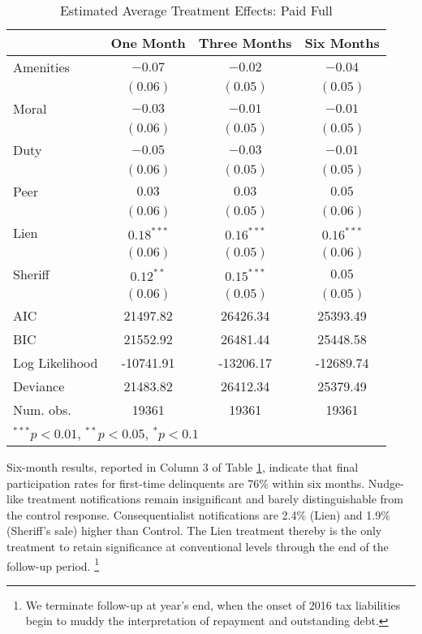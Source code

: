 \documentclass[12pt,titlepage]{article}
\begin{document}
\begin{table}[htbp]
\caption{Estimated Average Treatment Effects: Paid Full}
\begin{center}
\begin{tabular}{l c c c }
\hline
               & One Month & Three Months & Six Months \\
\hline
Amenities      & $-0.07$      & $-0.02$      & $-0.04$      \\
               & $(0.06)$     & $(0.05)$     & $(0.05)$     \\
Moral          & $-0.03$      & $-0.01$      & $-0.01$      \\
               & $(0.06)$     & $(0.05)$     & $(0.05)$     \\
Duty           & $-0.05$      & $-0.03$      & $-0.01$      \\
               & $(0.06)$     & $(0.05)$     & $(0.05)$     \\
Peer           & $0.03$       & $0.03$       & $0.05$       \\
               & $(0.06)$     & $(0.05)$     & $(0.06)$     \\
Lien           & $0.18^{***}$ & $0.16^{***}$ & $0.16^{***}$ \\
               & $(0.06)$     & $(0.05)$     & $(0.06)$     \\
Sheriff        & $0.12^{**}$  & $0.15^{***}$ & $0.05$       \\
               & $(0.06)$     & $(0.05)$     & $(0.05)$     \\
\hline
AIC            & 21497.82     & 26426.34     & 25393.49     \\
BIC            & 21552.92     & 26481.44     & 25448.58     \\
Log Likelihood & -10741.91    & -13206.17    & -12689.74    \\
Deviance       & 21483.82     & 26412.34     & 25379.49     \\
Num. obs.      & 19361        & 19361        & 19361        \\
\hline
\multicolumn{4}{l}{\scriptsize{$^{***}p<0.01$, $^{**}p<0.05$, $^*p<0.1$}}
\end{tabular}
\label{tbl:reg7_pf}
\end{center}
\end{table}



Six-month results, reported in Column 3 of Table \ref{tbl:reg7_pf}, indicate that final 
participation rates for first-time delinquents are 76\% within six months. 
Nudge-like treatment notifications remain insignificant and barely 
distinguishable from the control response. Consequentialist notifications 
are 2.4\% (Lien) and 1.9\% (Sheriff's sale) higher than Control. The Lien treatment 
thereby is the only treatment to retain significance at conventional 
levels through the end of the follow-up period.
\footnote{
	We terminate follow-up at year's end, when the onset of 2016 tax liabilities 
	begin to muddy the interpretation of repayment and outstanding debt.
}
\end{document}
